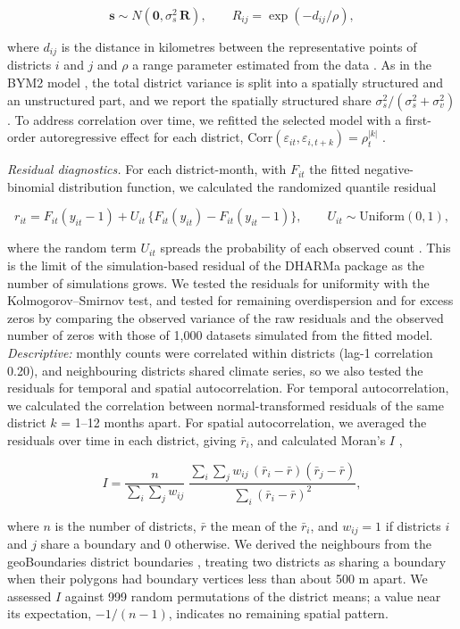 \documentclass[11pt,a4paper]{article}
\begin{document}
\[\mathbf{s} \sim N\left(\mathbf{0}, \sigma_s^2\,\mathbf{R}\right), \qquad R_{ij} = \exp(-d_{ij}/\rho),\]

where \(d_{ij}\) is the distance in kilometres between the representative points of districts \(i\) and \(j\) and \(\rho\) a range parameter estimated from the data \cite{ref35}. As in the BYM2 model \cite{ref74}, the total district variance is split into a spatially structured and an unstructured part, and we report the spatially structured share \(\sigma_s^2/(\sigma_s^2+\sigma_v^2)\). To address correlation over time, we refitted the selected model with a first-order autoregressive effect for each district, \(\mathrm{Corr}(\varepsilon_{it}, \varepsilon_{i,t+k}) = \rho_t^{|k|}\) \cite{ref35}.

\emph{Residual diagnostics.} For each district-month, with \(F_{it}\) the fitted negative-binomial distribution function, we calculated the randomized quantile residual

\[r_{it} = F_{it}(y_{it}-1) + U_{it}\,\lbrace F_{it}(y_{it}) - F_{it}(y_{it}-1)\rbrace, \qquad U_{it}\sim \mathrm{Uniform}(0,1),\]

where the random term \(U_{it}\) spreads the probability of each observed count \cite{ref48}. This is the limit of the simulation-based residual of the DHARMa package \cite{ref29} as the number of simulations grows. We tested the residuals for uniformity with the Kolmogorov--Smirnov test, and tested for remaining overdispersion and for excess zeros by comparing the observed variance of the raw residuals and the observed number of zeros with those of 1,000 datasets simulated from the fitted model. \emph{Descriptive:} monthly counts were correlated within districts (lag-1 correlation 0.20), and neighbouring districts shared climate series, so we also tested the residuals for temporal and spatial autocorrelation. For temporal autocorrelation, we calculated the correlation between normal-transformed residuals of the same district \(k\) = 1--12 months apart. For spatial autocorrelation, we averaged the residuals over time in each district, giving \(\bar{r}_i\), and calculated Moran's \(I\) \cite{ref49},

\[I = \frac{n}{\sum_{i}\sum_{j} w_{ij}}\;\frac{\sum_{i}\sum_{j} w_{ij}\,(\bar{r}_i - \bar{r})(\bar{r}_j - \bar{r})}{\sum_{i}(\bar{r}_i - \bar{r})^2},\]

where \(n\) is the number of districts, \(\bar{r}\) the mean of the \(\bar{r}_i\), and \(w_{ij} = 1\) if districts \(i\) and \(j\) share a boundary and 0 otherwise. We derived the neighbours from the geoBoundaries district boundaries \cite{ref16}, treating two districts as sharing a boundary when their polygons had boundary vertices less than about 500 m apart. We assessed \(I\) against 999 random permutations of the district means; a value near its expectation, \(-1/(n-1)\), indicates no remaining spatial pattern.
\end{document}
